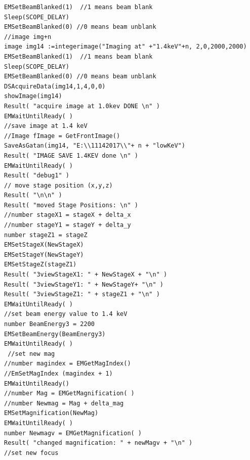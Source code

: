 \documentclass{article}
\begin{document}
\begin{verbatim}
EMSetBeamBlanked(1)  //1 means beam blank
Sleep(SCOPE_DELAY)
EMSetBeamBlanked(0) //0 means beam unblank
//image img+n
image img14 :=integerimage("Imaging at" +"1.4keV"+n, 2,0,2000,2000)
EMSetBeamBlanked(1)  //1 means beam blank
Sleep(SCOPE_DELAY)
EMSetBeamBlanked(0) //0 means beam unblank
DSAcquireData(img14,1,4,0,0)
showImage(img14)
Result( "acquire image at 1.0kev DONE \n" )
EMWaitUntilReady( )
//save image at 1.4 keV
//Image fImage = GetFrontImage()
SaveAsGatan(img14, "E:\\11142017\\"+ n + "lowKeV")
Result( "IMAGE SAVE 1.4KEV done \n" )
EMWaitUntilReady( )
Result( "debug1" )
// move stage position (x,y,z)
Result( "\n\n" )
Result( "moved Stage Positions: \n" )
//number stageX1 = stageX + delta_x
//number stageY1 = stageY + delta_y
number stageZ1 = stageZ
EMSetStageX(NewStageX)
EMSetStageY(NewStageY)
EMSetStageZ(stageZ1)
Result( "3viewStageX1: " + NewStageX + "\n" )
Result( "3viewStageY1: " + NewStageY+ "\n" )
Result( "3viewStageZ1: " + stageZ1 + "\n" )
EMWaitUntilReady( )
//set beam energy value to 1.4 keV
number BeamEnergy3 = 2200
EMSetBeamEnergy(BeamEnergy3)
EMWaitUntilReady( )
 //set new mag
//number magindex = EMGetMagIndex()
//EmSetMagIndex (magindex + 1)
EMWaitUntilReady()
//number Mag = EMGetMagnification( )
//number Newmag = Mag + delta_mag
EMSetMagnification(NewMag)
EMWaitUntilReady( )
number Newmagv = EMGetMagnification( )
Result( "changed magnification: " + newMagv + "\n" )
//set new focus
\end{verbatim}
\end{document}
